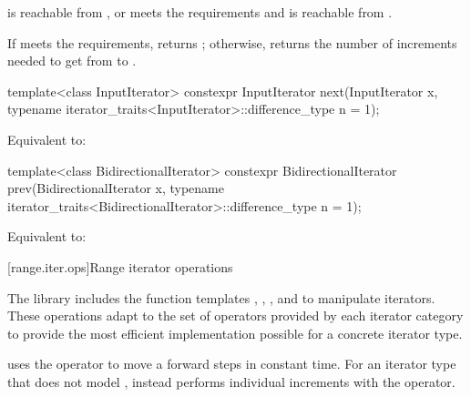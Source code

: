 \begin{itemdescr}
\pnum
\expects
{} is reachable from , or
 meets
the  requirements and
 is reachable from .

\pnum
\effects
If  meets the  requirements,
returns ; otherwise, returns
the number of increments needed to get from
to
.
\end{itemdescr}

%
\begin{itemdecl}
template<class InputIterator>
  constexpr InputIterator next(InputIterator x,
    typename iterator_traits<InputIterator>::difference_type n = 1);
\end{itemdecl}

\begin{itemdescr}
\pnum
\effects Equivalent to: 
\end{itemdescr}

%
\begin{itemdecl}
template<class BidirectionalIterator>
  constexpr BidirectionalIterator prev(BidirectionalIterator x,
    typename iterator_traits<BidirectionalIterator>::difference_type n = 1);
\end{itemdecl}

\begin{itemdescr}
\pnum
\effects Equivalent to: 
\end{itemdescr}

[range.iter.ops]{Range iterator operations}

\pnum
The library includes the function templates
, ,
, and 
to manipulate iterators. These operations adapt to the set of operators
provided by each iterator category to provide the most efficient implementation
possible for a concrete iterator type.
\begin{example}
 uses the \tcode{+} operator to move a
 forward  steps in constant time.
For an iterator type that does not model ,
 instead performs  individual increments with
the \tcode{++} operator.
\end{example}

